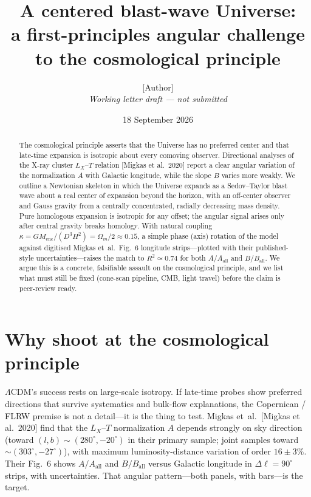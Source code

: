 \documentclass[11pt,a4paper]{article}
\title{A centered blast-wave Universe:\\
a first-principles angular challenge to the cosmological principle}
\author{[Author]\\
\textit{Working letter draft --- not submitted}}
\date{18 September 2026}
\begin{document}
\maketitle

\begin{abstract}
The cosmological principle asserts that the Universe has no preferred center and that late-time expansion is isotropic about every comoving observer. Directional analyses of the X-ray cluster \(L_X\)--\(T\) relation [Migkas et al.\ 2020] report a clear angular variation of the normalization \(A\) with Galactic longitude, while the slope \(B\) varies more weakly. We outline a Newtonian skeleton in which the Universe expands as a Sedov--Taylor blast wave about a real center of expansion beyond the horizon, with an off-center observer and Gauss gravity from a centrally concentrated, radially decreasing mass density. Pure homologous expansion is isotropic for any offset; the angular signal arises only after central gravity breaks homology. With natural coupling \(\kappa = GM_{\mathrm{enc}}/(D^3H^2)=\Omega_m/2\approx 0.15\), a simple phase (axis) rotation of the model against digitised Migkas et~al.\ Fig.~6 longitude strips---plotted with their published-style uncertainties---raises the match to \(R^2\simeq 0.74\) for both \(A/A_{\mathrm{all}}\) and \(B/B_{\mathrm{all}}\). We argue this is a concrete, falsifiable assault on the cosmological principle, and we list what must still be fixed (cone-scan pipeline, CMB, light travel) before the claim is peer-review ready.
\end{abstract}

\section{Why shoot at the cosmological principle}

\(\Lambda\)CDM's success rests on large-scale isotropy. If late-time probes show preferred directions that survive systematics and bulk-flow explanations, the Copernican / FLRW premise is not a detail---it is the thing to test. Migkas et~al.\ [Migkas et al.\ 2020] find that the \(L_X\)--\(T\) normalization \(A\) depends strongly on sky direction (toward \((l,b)\sim(280^\circ,-20^\circ)\) in their primary sample; joint samples toward \(\sim(303^\circ,-27^\circ)\)), with maximum luminosity-distance variation of order \(16\pm 3\%\). Their Fig.~6 shows \(A/A_{\mathrm{all}}\) and \(B/B_{\mathrm{all}}\) versus Galactic longitude in \(\Delta\ell=90^\circ\) strips, with uncertainties. That angular pattern---both panels, with bars---is the target.
\end{document}
